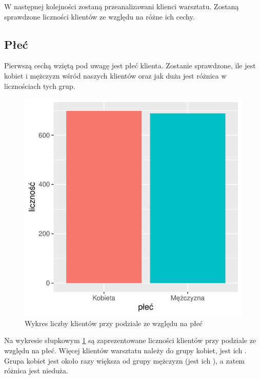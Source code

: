 \documentclass{article}\usepackage[]{graphicx}\usepackage[]{xcolor}
\makeatletter
\def\maxwidth{ %
  \ifdim\Gin@nat@width>\linewidth
    \linewidth
  \else
    \Gin@nat@width
  \fi
}
\newenvironment{knitrout}{}{} %
\makeatother
\begin{document}
W następnej kolejności zostaną przeanalizawani klienci warsztatu. Zostaną sprawdzone liczności klientów ze względu na różne ich cechy.

\subsection{Płeć}

Pierwszą cechą wziętą pod uwagę jest płeć klienta. Zostanie sprawdzone, ile jest kobiet i mężczyzn wśród naszych klientów oraz jak duża jest różnica w licznościach tych grup.

\begin{knitrout}
\color{fgcolor}\begin{figure}[H]

{\centering \includegraphics[width=\maxwidth]{figure/fig_plec-1} 

}

\caption[Wykres liczby klientów przy podziale ze względu na płeć]{Wykres liczby klientów przy podziale ze względu na płeć}\label{fig:fig_plec}
\end{figure}

\end{knitrout}

Na wykresie słupkowym \ref{fig:fig_plec} są zaprezentowane liczności klientów przy podziale ze względu na płeć. Więcej klientów warsztatu należy do grupy kobiet, jest ich . Grupa kobiet jest około 
razy większa od grupy mężczyzn (jest ich ), a zatem różnica jest nieduża.
\end{document}
